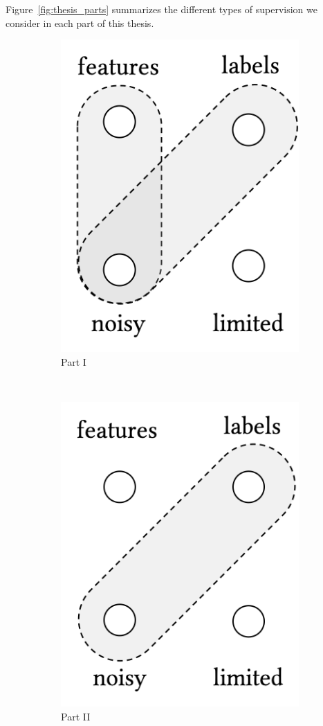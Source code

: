 Figure~\ref{fig:thesis_parts} summarizes the different types of supervision we consider in each part of this thesis.
\begin{figure}[t]
    \centering
    \begin{subfigure}[b]{0.32\textwidth}
    \centering
        \includegraphics[width=0.55\linewidth]{01-introduction/figs_and_tables/fig_p1.png}
        \caption{\label{fig:p1}Part I}
    \end{subfigure}
        ~ 
    \begin{subfigure}[b]{0.32\textwidth}
    \centering
        \includegraphics[width=0.55\linewidth]{01-introduction/figs_and_tables/fig_p2.png}
        \caption{\label{fig:p2}Part II}
    \end{subfigure}
        ~ 
    \begin{subfigure}[b]{0.32\textwidth}

\end{subfigure}
\end{figure}
